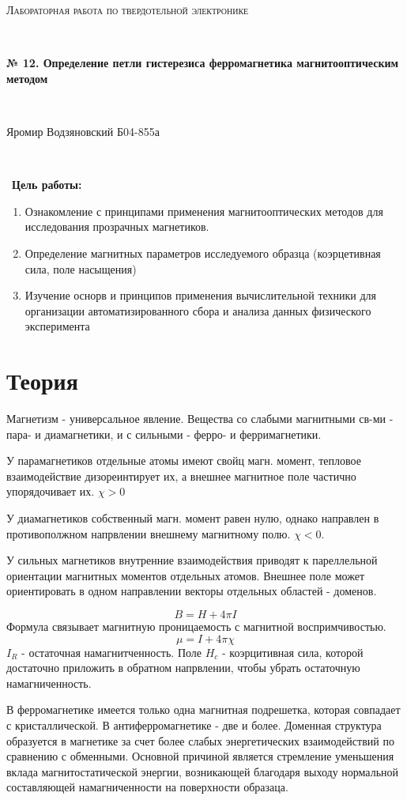 \documentclass[a4paper]{article}
\begin{document}
\graphicspath{ {pictures/} }
\begin{center}
    {\scshape\Large Лабораторная работа по твердотельной электронике} \par

    \

    {\huge\bfseries № 12. Определение петли гистерезиса ферромагнетика магнитооптическим методом} \par 

    \

    {\large Яромир Водзяновский Б04-855а}
\end{center}

\

\
\textbf{Цель работы:} \par 
\begin{enumerate}
    \item Ознакомление с принципами применения магнитооптических методов для исследования прозрачных магнетиков. 
    \item Определение магнитных параметров исследуемого образца (коэрцетивная сила, поле насыщения)
    \item Изучение оснорв и принципов применения вычислительной техники для организации  автоматизированного сбора и анализа данных физического эксперимента
\end{enumerate}

\section{Теория}

Магнетизм - универсальное явление. Вещества со слабыми магнитными св-ми - пара- и диамагнетики, и с сильными - ферро- и ферримагнетики. \par 
У парамагнетиков отдельные атомы имеют свойц магн. момент, тепловое взаимодействие дизореинтирует их, а внешнее магнитное поле частично упорядочивает их. $\chi > 0$ \par 
У диамагнетиков собственный магн. момент равен нулю, однако направлен в противополжном напрвлении внешнему магнитному полю. $\chi < 0$. \par 
У сильных магнетиков внутренние взаимодействия приводят к пареллельной ориентации магнитных моментов отдельных атомов. Внешнее поле может ориентировать в одном направлении векторы отдельных областей - доменов. \par 
$$B = H + 4 \pi I$$
Формула связывает магнитную проницаемость с магнитной воспримчивостью. 
$$\mu = I + 4 \pi \chi$$
$I_R$ - остаточная намагнитченность. Поле $H_c$ - коэрцитивная сила, которой достаточно приложить в обратном напрвлении, чтобы убрать остаточную намагниченность. \par 
В ферромагнетике имеется только одна магнитная подрешетка, которая совпадает с кристаллической. В антиферромагнетике - две и более. Доменная структура образуется в магнетике за счет более слабых энергетических 
взаимодействий по сравнению с обменными. Основной причиной является стремление уменьшения вклада магнитостатической энергии, возникающей благодаря выходу нормальной составляющей намагниченности на поверхности  образаца.  \par 
\end{document}
